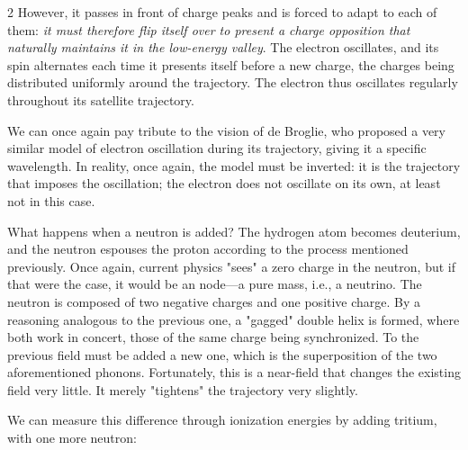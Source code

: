 \begin{multicols}{2}
	However, it passes in front of charge peaks and is forced to adapt to each of them: \textit{it must therefore flip itself over to present a charge opposition that naturally maintains it in the low-energy valley}. The electron oscillates, and its spin alternates each time it presents itself before a new charge, the charges being distributed uniformly around the trajectory. The electron thus oscillates regularly throughout its satellite trajectory.
	
	
	
	We can once again pay tribute to the vision of de Broglie, who proposed a very similar model of electron oscillation during its trajectory, giving it a specific wavelength.\cite{debroglie1956tentative} In reality, once again, the model must be inverted: it is the trajectory that imposes the oscillation; the electron does not oscillate on its own, at least not in this case.
	
	What happens when a neutron is added? The hydrogen atom becomes deuterium, and the neutron espouses the proton according to the process mentioned previously. Once again, current physics "sees" a zero charge in the neutron, but if that were the case, it would be an  node—a pure mass, i.e., a neutrino. The neutron is composed of two negative  charges and one positive  charge. By a reasoning analogous to the previous one, a "gagged" double helix is formed, where both work in concert, those of the same charge being synchronized. To the previous field must be added a new one, which is the superposition of the two aforementioned phonons. Fortunately, this is a near-field that changes the existing field very little. It merely "tightens" the trajectory very slightly.
	
	We can measure this difference through ionization energies by adding tritium, with one more neutron:
	
    \end{multicols}
	\begin{center}
	\end{center}

